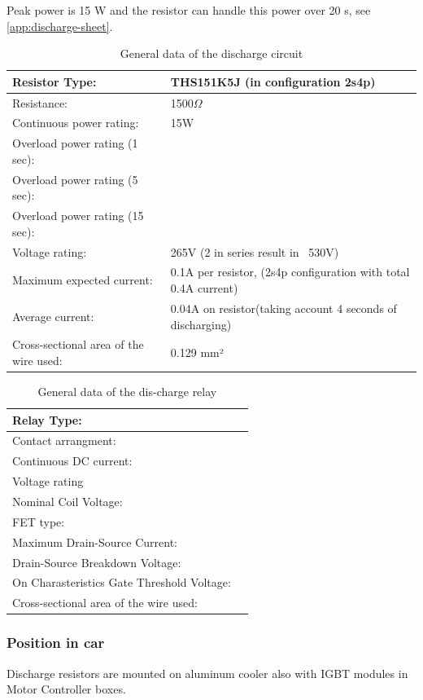 Peak power is 15 W and the resistor can handle this power over 20 s, see \ref{app:discharge-sheet}.

\begin{table}[H]
	\centering
	\caption{General data of the discharge circuit}
	\begin{tabularx}{\textwidth}{|X|X|}
		\hline
		Resistor Type: & THS151K5J (in configuration 2s4p) \\[\TableSize]
		\hline
		Resistance: & 1500$\Omega$ \\[\TableSize]
		\hline
		Continuous power rating: & 15W \\[\TableSize]
		\hline
		Overload power rating (1 sec): & \\[\TableSize]
		\hline
		Overload power rating (5 sec): &  \\[\TableSize]
		\hline
		Overload power rating (15 sec): &  \\[\TableSize]
		\hline
		Voltage rating: & 265V (2 in series result in ~530V) \\[\TableSize]
		\hline
		Maximum expected current: & 0.1A per resistor, (2s4p configuration with total 0.4A current) \\[\TableSize]
		\hline
		Average current: & 0.04A on resistor(taking account 4 seconds of discharging) \\[\TableSize]
		\hline
		Cross-sectional area of the wire used: & 0.129 mm² \\[\TableSize]
		\hline
	\end{tabularx}%
	\label{tab:dischrage-circ}%
\end{table}%

\begin{table}[H]
	\centering
	\caption{General data of the dis-charge relay}
	\begin{tabularx}{\textwidth}{|X|X|}
		\hline
		Relay Type: &  \\[\TableSize]
		\hline
		Contact arrangment: &  \\[\TableSize]
		\hline
		Continuous DC current:  &  \\[\TableSize]
		\hline
		Voltage rating  & \\[\TableSize]
		\hline
		Nominal Coil Voltage: & \\[\TableSize]
		\hline
		FET type: &  \\[\TableSize]
		\hline
		Maximum Drain-Source Current: &\\[\TableSize]
		\hline
		Drain-Source Breakdown Voltage: &  \\[\TableSize]
		\hline
		On Charasteristics Gate Threshold Voltage: & \\[\TableSize]
		\hline
		Cross-sectional area of the wire used: & \\[\TableSize]
		\hline
	\end{tabularx}%
	\label{tab:discharge-relay}%
\end{table}%


\subsubsection{Position in car}

Discharge resistors are mounted on aluminum cooler also with IGBT modules in Motor Controller boxes.